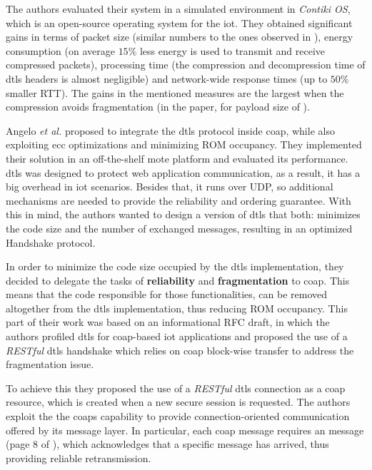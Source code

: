 \documentclass{llncs}
\begin{document}
The authors evaluated their system in a simulated environment in \textit{Contiki OS}\cite{ContikiT75:online}, which is an open-source operating system for the \gls{iot}.
They obtained significant gains in terms of packet size (similar numbers to the
ones observed in \cite{6LoWPANC53:online}), energy consumption (on average $15\%$ less
energy is used to transmit and receive compressed packets), processing time
(the compression and decompression time of \gls{dtls} headers is almost negligible)
and network-wide response times (up to $50\%$ smaller RTT). The
gains in the mentioned measures are the largest when the compression avoids
fragmentation (in the paper, for payload size of ).

Angelo \textit{et al.} \cite{Security5:online} proposed to integrate the \gls{dtls} protocol
inside \gls{coap}, while also exploiting \gls{ecc} optimizations and minimizing
ROM occupancy. They implemented their solution in an off-the-shelf mote platform
and evaluated its performance. \gls{dtls} was designed to protect web application communication, as a result,
it has a big overhead in \gls{iot} scenarios. Besides that, it runs over UDP,
so additional mechanisms are needed to provide the reliability and ordering
guarantee. With this in mind, the authors wanted to design a version of \gls{dtls}
that both: minimizes the code size and the number of exchanged messages, resulting
in an optimized Handshake protocol.

In order to minimize the code size occupied by the \gls{dtls} implementation, they
decided to delegate the tasks of \textbf{reliability} and \textbf{fragmentation} to
\gls{coap}. This means that the code responsible for those functionalities,
can be removed altogether from the \gls{dtls} implementation, thus reducing ROM
occupancy. This part of their work was based on an informational RFC draft\cite{I-D.keoh-dtls-profile-iot}, in which the
authors profiled \gls{dtls} for \gls{coap}-based \gls{iot} applications and proposed
the use of a \textit{RESTful} \gls{dtls} handshake which relies on \gls{coap} block-wise
transfer to address the fragmentation issue.

To achieve this they  proposed the use of a \textit{RESTful} \gls{dtls} connection as a \gls{coap} resource,
which is created when a new secure session is requested.
The authors exploit the the \gls{coap}s capability to provide connection-oriented
communication offered by its message layer. In particular, each 
\gls{coap} message requires an  message (page 8 of  \cite{RFC7252}),
which acknowledges that a specific  message has arrived, thus
providing reliable retransmission.
\end{document}
